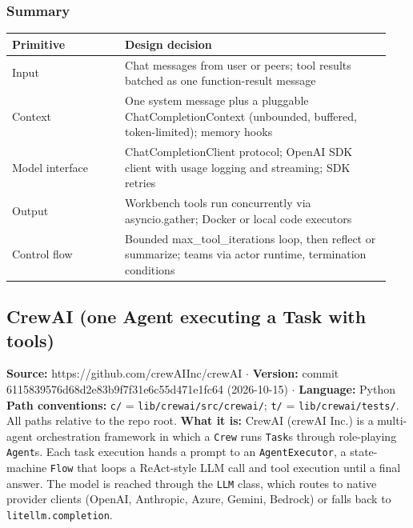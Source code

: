 \subsubsection*{Summary}
\begin{longtable}{@{}p{0.28\linewidth}p{0.66\linewidth}@{}}
\toprule \textbf{Primitive} & \textbf{Design decision} \\ \midrule \endhead
Input & Chat messages from user or peers; tool results batched as one function-result message \\
Context & One system message plus a pluggable ChatCompletionContext (unbounded, buffered, token-limited); memory hooks \\
Model interface & ChatCompletionClient protocol; OpenAI SDK client with usage logging and streaming; SDK retries \\
Output & Workbench tools run concurrently via asyncio.gather; Docker or local code executors \\
Control flow & Bounded max\_tool\_iterations loop, then reflect or summarize; teams via actor runtime, termination conditions \\
\bottomrule \end{longtable}


\subsection{CrewAI (one Agent executing a Task with tools)}

\textbf{Source:} https://github.com/crewAIInc/crewAI $\cdot$ \textbf{Version:} commit 6115839576d68d2e83b9f7f31e6c55d471e1fc64 (2026-10-15) $\cdot$ \textbf{Language:} Python
\textbf{Path conventions:} \texttt{c/\allowbreak{}} = \texttt{lib/\allowbreak{}crewai/\allowbreak{}src/\allowbreak{}crewai/\allowbreak{}}; \texttt{t/\allowbreak{}} = \texttt{lib/\allowbreak{}crewai/\allowbreak{}tests/\allowbreak{}}. All paths relative to the repo root.
\textbf{What it is:} CrewAI (crewAI Inc.) is a multi-agent orchestration framework in which a \texttt{Crew} runs \texttt{Task}s through role-playing \texttt{Agent}s. Each task execution hands a prompt to an \texttt{AgentExecutor}, a state-machine \texttt{Flow} that loops a ReAct-style LLM call and tool execution until a final answer. The model is reached through the \texttt{LLM} class, which routes to native provider clients (OpenAI, Anthropic, Azure, Gemini, Bedrock) or falls back to \texttt{litellm.\allowbreak{}completion}.

